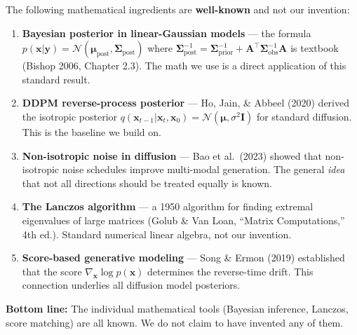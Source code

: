 \documentclass[12pt,a4paper]{article}
\newcommand{\cN}{\mathcal{N}}
\begin{document}
\begin{tcolorbox}[
  colback=gray!5, colframe=gray!60!black,
  fonttitle=\bfseries\large, title={What is NOT new (established prior work)},
  top=3mm, bottom=3mm
]
The following mathematical ingredients are \textbf{well-known} and not our invention:

\begin{enumerate}[leftmargin=*, itemsep=4pt]
  \item \textbf{Bayesian posterior in linear-Gaussian models} --- the formula $p(\bm{x}|\bm{y}) = \cN(\bm{\mu}_{\text{post}}, \bm{\Sigma}_{\text{post}})$ where $\bm{\Sigma}_{\text{post}}^{-1} = \bm{\Sigma}_{\text{prior}}^{-1} + \bm{A}^\top \bm{\Sigma}_{\text{obs}}^{-1} \bm{A}$ is textbook (Bishop 2006, Chapter 2.3). The math we use is a direct application of this standard result.

  \item \textbf{DDPM reverse-process posterior} --- Ho, Jain, \& Abbeel (2020) derived the isotropic posterior $q(\bm{x}_{t-1}|\bm{x}_t, \bm{x}_0) = \cN(\bm{\mu}, \sigma^2 \bm{I})$ for standard diffusion. This is the baseline we build on.

  \item \textbf{Non-isotropic noise in diffusion} --- Bao et al.\ (2023) showed that non-isotropic noise schedules improve multi-modal generation. The general \emph{idea} that not all directions should be treated equally is known.

  \item \textbf{The Lanczos algorithm} --- a 1950 algorithm for finding extremal eigenvalues of large matrices (Golub \& Van Loan, ``Matrix Computations,'' 4th ed.). Standard numerical linear algebra, not our invention.

  \item \textbf{Score-based generative modeling} --- Song \& Ermon (2019) established that the score $\nabla_{\bm{x}} \log p(\bm{x})$ determines the reverse-time drift. This connection underlies all diffusion model posteriors.
\end{enumerate}

\textbf{Bottom line:} The individual mathematical tools (Bayesian inference, Lanczos, score matching) are all known. We do not claim to have invented any of them.
\end{tcolorbox}

\vspace{0.8em}
\end{document}
